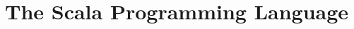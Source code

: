 \documentclass[a4paper,12pt,twoside,titlepage]{book}
\newcommand{\langname}[1]{#1{}}
\newcommand{\Scala}{\langname{Scala}}
\begin{document}
\frontmatter
\makedoctitle
\clearemptydoublepage
\tableofcontents
\mainmatter


\setcounter{secnumdepth}{-1}

\section{The \Scala{} Programming Language}


\end{document}
